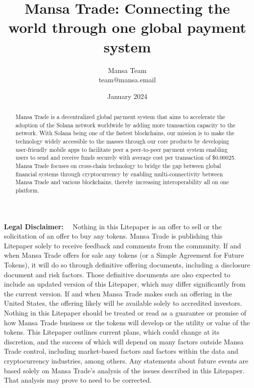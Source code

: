 \documentclass{article}
\title{Mansa Trade: Connecting the world through one global payment system}
\author{
        Mansa Team \\
        team@mansa.email\\
}
\date{January 2024}
\begin{document}
\maketitle

\textbf{\footnotesize Legal Disclaimer:}\scriptsize
~~Nothing in this Litepaper is an offer to sell or the solicitation of an offer to buy any tokens. Mansa Trade is publishing this Litepaper solely to receive feedback and comments from the community. If and when Mansa Trade offers for sale any tokens (or a Simple Agreement for Future Tokens), it will do so through definitive offering documents, including a disclosure document and risk factors. Those definitive documents are also expected to include an updated version of this Litepaper, which may differ significantly from the current version. If and when Mansa Trade makes such an offering in the United States, the offering likely will be available solely to accredited investors. 
Nothing in this Litepaper should be treated or read as a guarantee or promise of how Mansa Trade business or the tokens will develop or the utility or value of the tokens. This Litepaper outlines current plans, which could change at its discretion, and the success of which will depend on many factors outside Mansa Trade control, including market-based factors and factors within the data and cryptocurrency industries, among others. Any statements about future events are based solely on Mansa Trade's analysis of the issues described in this Litepaper. That analysis may prove to need to be corrected.

\begin{abstract}
Mansa Trade is a decentralized global payment system that aims to accelerate the adoption of the Solana network worldwide by adding more transaction capacity to the network.
With Solana being one of the fastest blockchains, our mission is to make the technology widely accessible to the masses through our core products by developing user-friendly mobile apps to facilitate peer a peer-to-peer payment system enabling users to send and receive funds securely with average cost per transaction of \$0.00025.
Mansa Trade focuses on cross-chain technology to bridge the gap between global financial systems through cryptocurrency by enabling multi-connectivity between Mansa Trade and various blockchains, thereby increasing interoperability all on one platform.
\end{abstract}
\newpage
\end{document}
